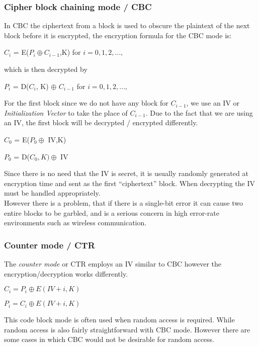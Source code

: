 \documentclass[a4paper]{article}
\begin{document}
\subsubsection{Cipher block chaining mode / CBC}
In CBC the ciphertext from a block is used to obscure the plaintext of the next block before it is encrypted, the encryption formula for the CBC mode is:
\begin{center}
    $C_i$ = E($P_i \oplus C_{i-1}$,K) for $i = 0,1,2,...,$
\end{center}{}
which is then decrypted by
\begin{center}
    $P_i$ = D($C_i$, K) $\oplus$ $C_{i-1}$ for $i = 0,1,2,...,$
\end{center}{}
For the first block since we do not have any block for $C_{i-1}$, we use an IV or \textit{Initialization Vector} to take the place of $C_{i-1}$. Due to the fact that we are using an IV, the first block will be decrypted / encrypted differently.
\begin{center}
    $C_0$ = E($P_0 \oplus $ IV,K)
\end{center}{}
\begin{center}
    $P_0$ = D($C_0,K) \oplus $ IV
\end{center}{}
Since there is no need that the IV is secret, it is usually randomly generated at encryption time and sent as the first ``ciphertext'' block. When decrypting the IV must be handled appropriately.\\
However there is a problem, that if there is a single-bit error it can cause two entire blocks to be garbled, and is a serious concern in high error-rate environments such as wireless communication.

\subsubsection{Counter mode / CTR}
The \textit{counter mode} or CTR employs an IV similar to CBC however the encryption/decryption works differently.
\begin{center}
    $C_i = P_i \oplus E(IV + i,K)$
\end{center}{}
\begin{center}
    $P_i = C_i \oplus E(IV + i,K)$
\end{center}{}
This code block mode is often used when random access is required. While random access is also fairly straightforward with CBC mode. However there are some cases in which CBC would not be desirable for random access. 
\end{document}

